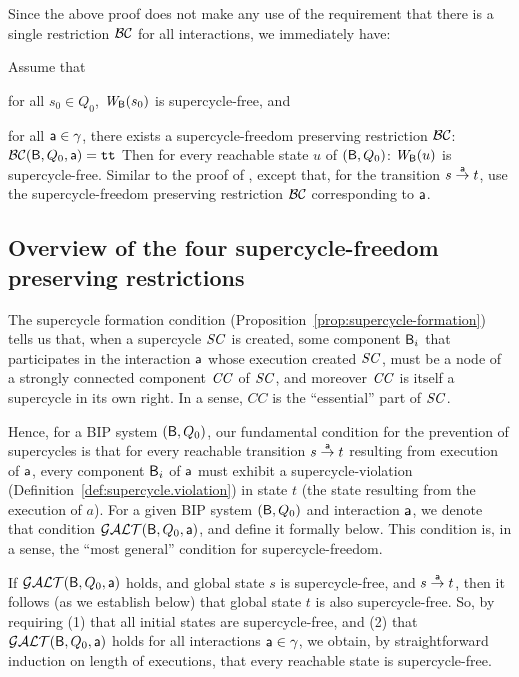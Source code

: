 Since the above proof does not make any use of the requirement that there is a single restriction
$\BC$ for all interactions, we immediately have:



\label{cor:SC-free-preserving.deadlock-free}
Assume that
\bn
\item \label{cor:SC-free-preserving.initial}
      for all $s_0 \in Q_0$, $\wfg{\B}{s_0}$ is supercycle-free, and
\item \label{cor:SC-free-preserving.reachable-transitions}
   for all $\act \in \gamma$, there exists a supercycle-freedom preserving restriction $\BC$: $\BC(\B, Q_0, \act) = \ttt$ 
\en
Then for every reachable state $u$ of $(\B, Q_0)$:  $\wfg{\B}{u}$ is supercycle-free.
\eco
%
\bpr
Similar to the proof of ,  except that, for
the transition $s \la{\act} t$, use the  supercycle-freedom preserving restriction $\BC$
corresponding to $\act$.
\epr


\subsection{Overview of the four supercycle-freedom preserving restrictions}

The supercycle formation condition
(Proposition~\ref{prop:supercycle-formation}) tells us that, when a
supercycle $\SC$ is created, some component $\B_i$ that participates
in the interaction $\act$ whose execution created $\SC$, must be a
node of a strongly connected component $\CC$ of $\SC$, and moreover
$\CC$ is itself a supercycle in its own right. In a sense, $CC$ is the
``essential'' part of $\SC$.

Hence, for a BIP system $(\B, Q_0)$, our fundamental condition for the
prevention of supercycles is that for every reachable transition
$s \goesto[\act] t$ resulting from execution of $\act$, every
component $\B_i$ of $\act$ must exhibit a supercycle-violation
(Definition~\ref{def:supercycle.violation}) in state $t$ (the state
resulting from the execution of $a$). For a given BIP system
$(\B, Q_0)$ and interaction $\act$, we denote that condition
$\GAO(\B, Q_0, \act)$, and define it formally below.  This condition
is, in a sense, the ``most general'' condition for supercycle-freedom.

If $\GAO(\B, Q_0, \act)$ holds, and global state $s$ is
supercycle-free, and $s \goesto[\act] t$, then it follows (as we
establish below) that global state $t$ is also supercycle-free.  So,
by requiring (1) that all initial states are supercycle-free, and (2)
that $\GAO(\B, Q_0, \act)$ holds for all interactions
$\act \in \gamma$, we obtain, by straightforward induction on length
of executions, that every reachable state is supercycle-free.

